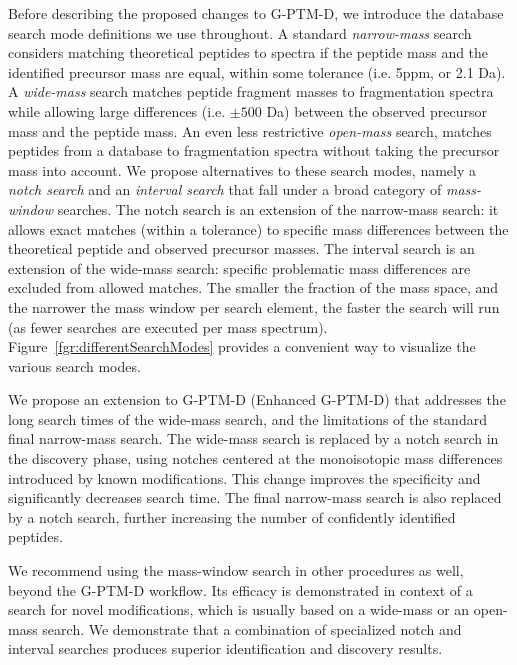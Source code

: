 \documentclass[journal=jprobs,manuscript=article]{achemso}
\begin{document}
Before describing the proposed changes to G-PTM-D, we introduce the database search mode definitions we use throughout. A standard \textit{narrow-mass} search considers matching theoretical peptides to spectra if the peptide mass and the identified precursor mass are equal, within some tolerance (i.e. 5ppm, or 2.1 Da). A \textit{wide-mass} search matches peptide fragment masses to fragmentation spectra while allowing large differences (i.e. $\pm 500$ Da) between the observed precursor mass and the peptide mass. An even less restrictive \textit{open-mass} search, matches peptides from a database to  fragmentation spectra without taking the precursor mass into account. We propose alternatives to these search modes, namely a \textit{notch search} and an \textit{interval search} that fall under a broad category of \textit{mass-window} searches. The notch search is an extension of the narrow-mass search: it allows exact matches (within a tolerance) to specific mass differences between the theoretical peptide and observed precursor masses. The interval search is an extension of the wide-mass search: specific problematic mass differences are excluded from allowed matches. The smaller the fraction of the mass space, and the narrower the mass window per search element, the faster the search will run (as fewer searches are executed per mass spectrum). Figure~\ref{fgr:differentSearchModes} provides a convenient way to visualize the various search modes.

We propose an extension to G-PTM-D (Enhanced G-PTM-D) that addresses the long search times of the wide-mass search, and the limitations of the standard final narrow-mass search. The wide-mass search is replaced by a notch search in the discovery phase, using notches centered at the monoisotopic mass differences introduced by known modifications. This change improves the specificity and significantly decreases search time. The final narrow-mass search is also replaced by a notch search, further increasing the number of confidently identified peptides.

We recommend using the mass-window search in other procedures as well, beyond the G-PTM-D workflow. Its efficacy is demonstrated in context of a search for novel modifications, which is usually based on a wide-mass or an open-mass search. We demonstrate that a combination of specialized notch and interval searches produces superior identification and discovery results.
\end{document}
